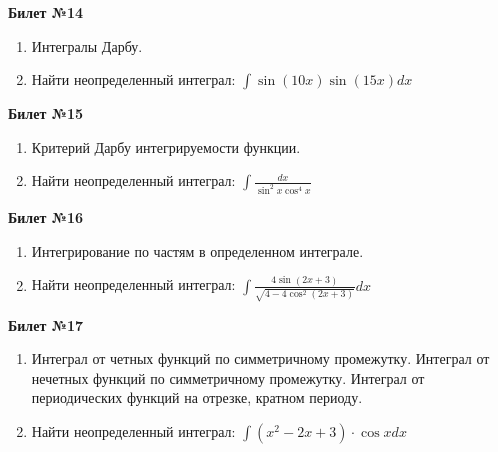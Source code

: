 \documentclass[a4paper, 12pt]{article}
\begin{document}
\begin{center}
	\textbf{Билет №14}
\end{center}
\begin{enumerate}
	\item Интегралы Дарбу.
	\item Найти неопределенный интеграл: $\displaystyle \int{\sin(10x) \sin(15x) dx}$
\end{enumerate}

\begin{center}
	\textbf{Билет №15}
\end{center}
\begin{enumerate}
	\item Критерий Дарбу интегрируемости функции.
	\item Найти неопределенный интеграл: $\displaystyle \int{\frac{dx}{\sin^2 x \cos^4 x}}$
\end{enumerate}

\begin{center}
	\textbf{Билет №16}
\end{center}
\begin{enumerate}
	\item Интегрирование по частям в определенном интеграле.
	\item Найти неопределенный интеграл: $\displaystyle \int{\frac{4 \sin(2x+3)}{\sqrt{4 - 4\cos^2(2x+3)}}dx}$
\end{enumerate}

\begin{center}
	\textbf{Билет №17}
\end{center}
\begin{enumerate}
	\item Интеграл от четных функций по симметричному промежутку.
	Интеграл от нечетных функций по симметричному промежутку.
	Интеграл от периодических функций на отрезке, кратном периоду.
	\item Найти неопределенный интеграл: $\displaystyle \int{(x^2 - 2x + 3) \cdot \cos x dx}$
\end{enumerate}
\end{document}
